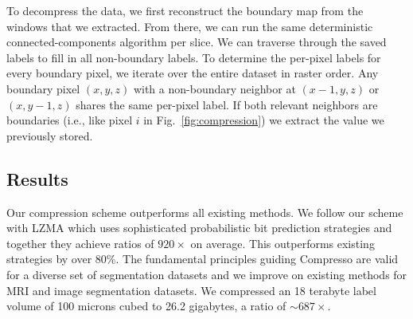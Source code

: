 To decompress the data, we first reconstruct the boundary map from the windows that we extracted.
From there, we can run the same deterministic connected-components algorithm per slice.
We can traverse through the saved labels to fill in all non-boundary labels.
To determine the per-pixel labels for every boundary pixel, we iterate over the entire dataset in raster order. 
Any boundary pixel $(x, y, z)$ with a non-boundary neighbor at $(x - 1, y, z)$ or $(x, y - 1, z)$ shares the same per-pixel label. 
If both relevant neighbors are boundaries (i.e., like pixel $i$ in Fig.~\ref{fig:compression}) we extract the value we previously stored.

\subsection{Results}

Our compression scheme outperforms all existing methods.
We follow our scheme with LZMA which uses sophisticated probabilistic bit prediction strategies and together they achieve ratios of $920\times$ on average.
This outperforms existing strategies by over 80\%.
The fundamental principles guiding Compresso are valid for a diverse set of segmentation datasets and we improve on existing methods for MRI and image segmentation datasets. 
We compressed an 18 terabyte label volume of 100 microns cubed to 26.2 gigabytes, a ratio of $\sim687\times$. 
